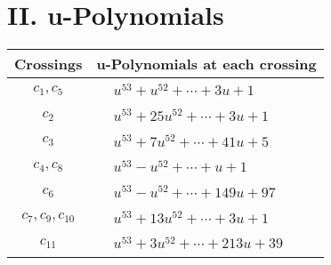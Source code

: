 \documentclass[1p]{elsarticle_modified}
\theoremstyle{definition}
\begin{document}
\newpage\renewcommand{\arraystretch}{1}
\centering \section*{ II. u-Polynomials}
\begin{tabular}{m{50pt}|m{274pt}}
Crossings & \hspace{64pt}u-Polynomials at each crossing \\
\hline $$\begin{aligned}c_{1},c_{5}\end{aligned}$$&$\begin{aligned}
&u^{53}+u^{52}+\cdots+3 u+1
\end{aligned}$\\
\hline $$\begin{aligned}c_{2}\end{aligned}$$&$\begin{aligned}
&u^{53}+25 u^{52}+\cdots+3 u+1
\end{aligned}$\\
\hline $$\begin{aligned}c_{3}\end{aligned}$$&$\begin{aligned}
&u^{53}+7 u^{52}+\cdots+41 u+5
\end{aligned}$\\
\hline $$\begin{aligned}c_{4},c_{8}\end{aligned}$$&$\begin{aligned}
&u^{53}- u^{52}+\cdots+u+1
\end{aligned}$\\
\hline $$\begin{aligned}c_{6}\end{aligned}$$&$\begin{aligned}
&u^{53}- u^{52}+\cdots+149 u+97
\end{aligned}$\\
\hline $$\begin{aligned}c_{7},c_{9},c_{10}\end{aligned}$$&$\begin{aligned}
&u^{53}+13 u^{52}+\cdots+3 u+1
\end{aligned}$\\
\hline $$\begin{aligned}c_{11}\end{aligned}$$&$\begin{aligned}
&u^{53}+3 u^{52}+\cdots+213 u+39
\end{aligned}$\\
\hline
\end{tabular}\newpage\renewcommand{\arraystretch}{1}
\end{document}
